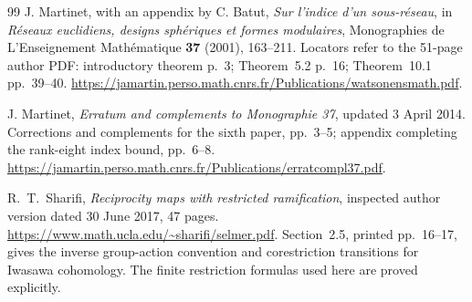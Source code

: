 \documentclass[11pt,a4paper]{article}
\theoremstyle{definition}
\begin{document}
\begin{thebibliography}{99}
J. Martinet, with an appendix by C. Batut,
\emph{Sur l'indice d'un sous-r\'eseau},
in \emph{R\'eseaux euclidiens, designs sph\'eriques et formes modulaires},
Monographies de L'Enseignement Math\'ematique \textbf{37}
(2001), 163--211.
Locators refer to the 51-page author PDF:
introductory theorem p.~3; Theorem~5.2 p.~16;
Theorem~10.1 pp.~39--40.
\url{https://jamartin.perso.math.cnrs.fr/Publications/watsonensmath.pdf}.


J. Martinet,
\emph{Erratum and complements to Monographie 37},
updated 3 April 2014.
Corrections and complements for the sixth paper, pp.~3--5;
appendix completing the rank-eight index bound, pp.~6--8.
\url{https://jamartin.perso.math.cnrs.fr/Publications/erratcompl37.pdf}.

R.~T.~Sharifi,
\emph{Reciprocity maps with restricted ramification},
inspected author version dated 30 June 2017, 47 pages.
\url{https://www.math.ucla.edu/~sharifi/selmer.pdf}.
Section~2.5, printed pp.~16--17, gives the inverse group-action
convention and corestriction transitions for Iwasawa cohomology.
The finite restriction formulas used here are proved explicitly.

\end{thebibliography}
\end{document}
